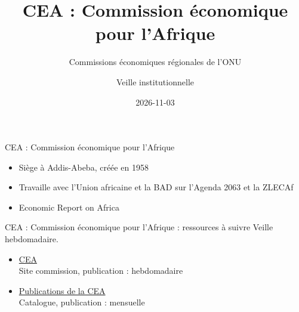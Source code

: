 \documentclass[aspectratio=169,11pt]{beamer}
\title{CEA : Commission économique pour l'Afrique}
\subtitle{Commissions économiques régionales de l'ONU}
\author{Veille institutionnelle}
\date{2026-11-03}
\begin{document}
\begin{frame}\titlepage\end{frame}

\begin{frame}{CEA : Commission économique pour l'Afrique}
\begin{itemize}
\item Siège à Addis-Abeba, créée en 1958
\item Travaille avec l'Union africaine et la BAD sur l'Agenda 2063 et la ZLECAf
\item Economic Report on Africa
\end{itemize}
\end{frame}

\begin{frame}{CEA : Commission économique pour l'Afrique : ressources à suivre}
\small
Veille hebdomadaire.
\begin{itemize}
\item \href{https://www.uneca.org}{CEA}\\{\footnotesize Site commission, publication : hebdomadaire}
\item \href{https://www.uneca.org/publications}{Publications de la CEA}\\{\footnotesize Catalogue, publication : mensuelle}
\end{itemize}
\end{frame}
\end{document}

